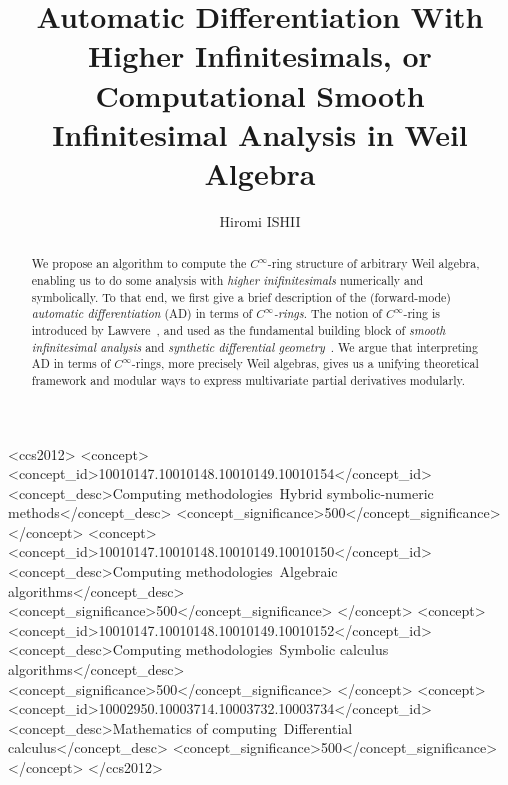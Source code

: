 \documentclass[%
  sigconf,authorversion,screen]{acmart}
\begin{document}
\title[Automatic Differentiation With Higher Infinitesimals]{Automatic Differentiation With Higher Infinitesimals, or Computational Smooth Infinitesimal Analysis in Weil Algebra}

\author{Hiromi ISHII}

\renewcommand{\shortauthors}{Hiromi ISHII}

\begin{abstract}
  \frenchspacing
  We propose an algorithm to compute the $C^\infty$-ring structure of arbitrary Weil algebra, enabling us to do some analysis with \emph{higher inifinitesimals} numerically and symbolically.
  To that end, we first give a brief description of the (forward-mode) \emph{automatic differentiation} (AD) in terms of \emph{$C^\infty$-rings}.
  The notion of $C^\infty$-ring is introduced by Lawvere~\cite{lawvere1979categorical}, and used as the fundamental building block of \emph{smooth infinitesimal analysis} and \emph{synthetic differential geometry}~\cite{Moerdijk:1991aa}.
  We argue that interpreting AD in terms of $C^\infty$-rings, more precisely Weil algebras, gives us a unifying theoretical framework and modular ways to express multivariate partial derivatives modularly.
\end{abstract}

\begin{CCSXML}
<ccs2012>
    <concept>
        <concept_id>10010147.10010148.10010149.10010154</concept_id>
        <concept_desc>Computing methodologies~Hybrid symbolic-numeric methods</concept_desc>
        <concept_significance>500</concept_significance>
        </concept>
    <concept>
        <concept_id>10010147.10010148.10010149.10010150</concept_id>
        <concept_desc>Computing methodologies~Algebraic algorithms</concept_desc>
        <concept_significance>500</concept_significance>
        </concept>
    <concept>
        <concept_id>10010147.10010148.10010149.10010152</concept_id>
        <concept_desc>Computing methodologies~Symbolic calculus algorithms</concept_desc>
        <concept_significance>500</concept_significance>
        </concept>
    <concept>
        <concept_id>10002950.10003714.10003732.10003734</concept_id>
        <concept_desc>Mathematics of computing~Differential calculus</concept_desc>
        <concept_significance>500</concept_significance>
        </concept>
  </ccs2012>
\end{CCSXML}
\end{document}
